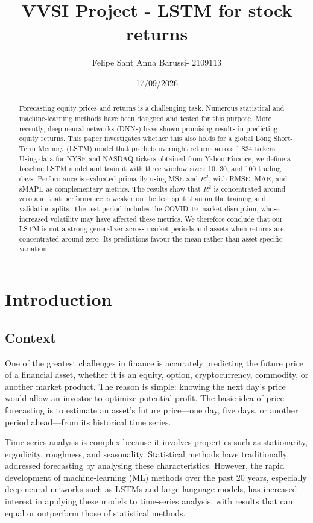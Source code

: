 \documentclass[12pt,a4paper]{article}
\title{VVSI Project - LSTM for stock returns}
\author{Felipe Sant Anna Barussi- 2109113}
\date{17/09/2026}
\begin{document}
\maketitle

\begin{abstract}
Forecasting equity prices and returns is a challenging task. Numerous
statistical and machine-learning methods have been designed and tested for this
purpose. More recently, deep neural networks (DNNs) have shown promising results
in predicting equity returns. This paper investigates whether this also holds
for a global Long Short-Term Memory (LSTM) model that predicts overnight returns
across 1,834 tickers. Using data for NYSE and NASDAQ tickers obtained from Yahoo
Finance, we define a baseline LSTM model and train it with three window sizes:
10, 30, and 100 trading days. Performance is evaluated primarily using MSE and
$R^2$, with RMSE, MAE, and sMAPE as complementary metrics. The results show that
$R^2$ is concentrated around zero and that performance is weaker on the test
split than on the training and validation splits. The test period includes the
COVID-19 market disruption, whose increased volatility may have affected these
metrics. We therefore conclude that our LSTM is not a strong generalizer across
market periods and assets when returns are concentrated around zero. Its
predictions favour the mean rather than asset-specific variation.
\end{abstract}

\section{Introduction}

\subsection{Context}
One of the greatest challenges in finance is accurately predicting the future
price of a financial asset, whether it is an equity, option, cryptocurrency,
commodity, or another market product. The reason is simple: knowing the next
day's price would allow an investor to optimize potential profit. The basic idea
of price forecasting is to estimate an asset's future price---one day, five
days, or another period ahead---from its historical time series.

Time-series analysis is complex because it involves properties such as
stationarity, ergodicity, roughness, and seasonality. Statistical methods have
traditionally addressed forecasting by analysing these characteristics.
However, the rapid development of machine-learning (ML) methods over the past
20 years, especially deep neural networks such as LSTMs and large language
models, has increased interest in applying these models to time-series analysis,
with results that can equal or outperform those of statistical methods.
\end{document}
